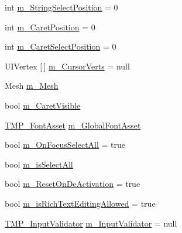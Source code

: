 \begin{DoxyCompactItemize}
\item 
int \mbox{\hyperlink{class_t_m_pro_1_1_t_m_p___input_field_abb17ee7de4a2f9ebaabec9e671928f61}{m\+\_\+\+String\+Select\+Position}} = 0
\item 
int \mbox{\hyperlink{class_t_m_pro_1_1_t_m_p___input_field_a9b15ea9c322d7d51733893da49799a9c}{m\+\_\+\+Caret\+Position}} = 0
\item 
int \mbox{\hyperlink{class_t_m_pro_1_1_t_m_p___input_field_af5bfddd9f54a20f9c9ea8654e24eb45a}{m\+\_\+\+Caret\+Select\+Position}} = 0
\item 
U\+I\+Vertex \mbox{[}$\,$\mbox{]} \mbox{\hyperlink{class_t_m_pro_1_1_t_m_p___input_field_a0b237f1b8bade0a11bd66f32d11f4c7e}{m\+\_\+\+Cursor\+Verts}} = null
\item 
Mesh \mbox{\hyperlink{class_t_m_pro_1_1_t_m_p___input_field_aa41edfd2c43f42a95c7f6ffcbf633686}{m\+\_\+\+Mesh}}
\item 
bool \mbox{\hyperlink{class_t_m_pro_1_1_t_m_p___input_field_a9bbaabf0475f8c76c7b48b4dd3c96b92}{m\+\_\+\+Caret\+Visible}}
\item 
\mbox{\hyperlink{class_t_m_pro_1_1_t_m_p___font_asset}{T\+M\+P\+\_\+\+Font\+Asset}} \mbox{\hyperlink{class_t_m_pro_1_1_t_m_p___input_field_a867ba97e4606bacc2f3eca57faad9c48}{m\+\_\+\+Global\+Font\+Asset}}
\item 
bool \mbox{\hyperlink{class_t_m_pro_1_1_t_m_p___input_field_a7f595e104245fea77a81e309cc9e527b}{m\+\_\+\+On\+Focus\+Select\+All}} = true
\item 
bool \mbox{\hyperlink{class_t_m_pro_1_1_t_m_p___input_field_a6d8562baedf249de6f7f6d12bc6c9a93}{m\+\_\+is\+Select\+All}}
\item 
bool \mbox{\hyperlink{class_t_m_pro_1_1_t_m_p___input_field_a565eda5a52adc73b118854dcd8c7f0e6}{m\+\_\+\+Reset\+On\+De\+Activation}} = true
\item 
bool \mbox{\hyperlink{class_t_m_pro_1_1_t_m_p___input_field_accb94749f5654852ae2edef1165a6f34}{m\+\_\+is\+Rich\+Text\+Editing\+Allowed}} = true
\item 
\mbox{\hyperlink{class_t_m_pro_1_1_t_m_p___input_validator}{T\+M\+P\+\_\+\+Input\+Validator}} \mbox{\hyperlink{class_t_m_pro_1_1_t_m_p___input_field_aa0aae2c2fc753f1d7ed97f552399b685}{m\+\_\+\+Input\+Validator}} = null
\end{DoxyCompactItemize}
